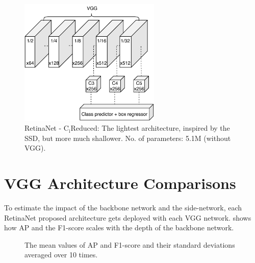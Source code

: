 \begin{figure}[!htb]
  \centering
  \includegraphics[width=0.6\textwidth]{figures/ch3/fig6.pdf}
  \caption{RetinaNet - $\text{C}_\text{i}\text{Reduced}$: The lightest architecture, inspired by the SSD, but more much shallower. No. of parameters: 5.1M (without VGG).}
  \label{fig6}
\end{figure} 

\section{VGG Architecture Comparisons}
To estimate the impact of the backbone network and the side-network, each RetinaNet proposed architecture gets deployed with each VGG network.  shows how AP and the F1-score scales with the depth of the backbone network.   

\begin{figure}[!htb]
  \centering
  
  \caption{The mean values of AP and F1-score and their standard deviations averaged over 10 times.}
  \label{fig7}
\end{figure}

